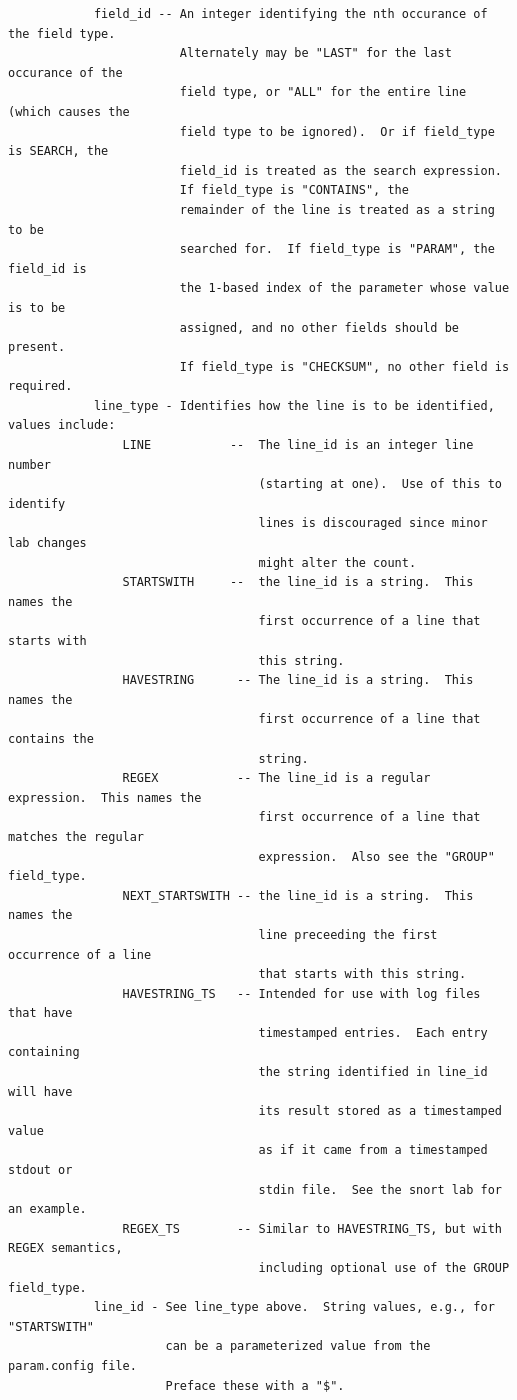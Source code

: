\documentclass[12pt]{article}
\begin{document}
\begin{verbatim}
            field_id -- An integer identifying the nth occurance of the field type.
                        Alternately may be "LAST" for the last occurance of the 
                        field type, or "ALL" for the entire line (which causes the 
                        field type to be ignored).  Or if field_type is SEARCH, the
                        field_id is treated as the search expression. 
                        If field_type is "CONTAINS", the 
                        remainder of the line is treated as a string to be 
                        searched for.  If field_type is "PARAM", the field_id is
                        the 1-based index of the parameter whose value is to be 
                        assigned, and no other fields should be present.
                        If field_type is "CHECKSUM", no other field is required.
            line_type - Identifies how the line is to be identified, values include:
                LINE           --  The line_id is an integer line number 
                                   (starting at one).  Use of this to identify 
                                   lines is discouraged since minor lab changes 
                                   might alter the count.
                STARTSWITH     --  the line_id is a string.  This names the 
                                   first occurrence of a line that starts with 
                                   this string. 
                HAVESTRING      -- The line_id is a string.  This names the 
                                   first occurrence of a line that contains the 
                                   string.
                REGEX           -- The line_id is a regular expression.  This names the 
                                   first occurrence of a line that matches the regular
                                   expression.  Also see the "GROUP" field_type.
                NEXT_STARTSWITH -- the line_id is a string.  This names the 
                                   line preceeding the first occurrence of a line 
                                   that starts with this string. 
                HAVESTRING_TS   -- Intended for use with log files that have 
                                   timestamped entries.  Each entry containing
                                   the string identified in line_id will have
                                   its result stored as a timestamped value
                                   as if it came from a timestamped stdout or 
                                   stdin file.  See the snort lab for an example.
                REGEX_TS        -- Similar to HAVESTRING_TS, but with REGEX semantics,
                                   including optional use of the GROUP field_type.
            line_id - See line_type above.  String values, e.g., for "STARTSWITH"
                      can be a parameterized value from the param.config file.
                      Preface these with a "$".
\end{verbatim}
\end{document}
